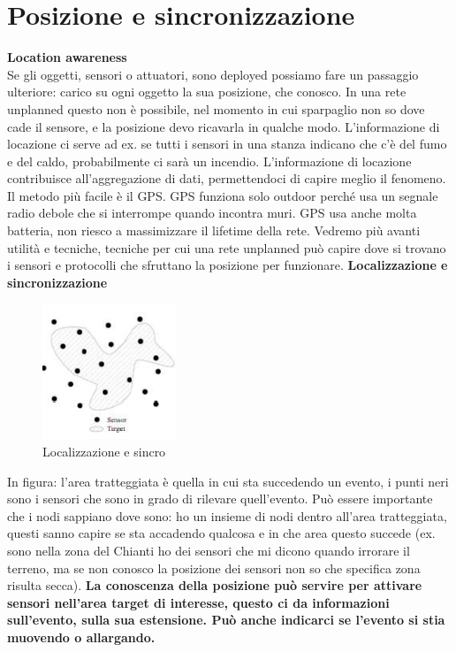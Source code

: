 \documentclass[12pt,italian]{report}
\begin{document}
\section{Posizione e sincronizzazione}
\label{sec:possinc}
\noindent\textbf{Location awareness} \\
Se gli oggetti, sensori o attuatori, sono deployed possiamo fare un passaggio ulteriore: carico su ogni oggetto la sua posizione, che conosco. In una rete unplanned questo non è possibile, nel momento in cui sparpaglio non so dove cade il sensore, e la posizione devo ricavarla in qualche modo. L'informazione di locazione ci serve ad ex. se tutti i sensori in una stanza indicano che c'è del fumo e del caldo, probabilmente ci sarà un incendio. L'informazione di locazione contribuisce all'aggregazione di dati, permettendoci di capire meglio il fenomeno. 
\bigbreak
Il metodo più facile è il GPS. GPS funziona solo outdoor perché usa un segnale radio debole che si interrompe quando incontra muri. GPS usa anche molta batteria, non riesco a massimizzare il lifetime della rete. 
\bigbreak
Vedremo più avanti utilità e tecniche, tecniche per cui una rete unplanned può capire dove si trovano i sensori e protocolli che sfruttano la posizione per funzionare.
\bigbreak
\noindent\textbf{Localizzazione e sincronizzazione} 
\begin{figure}[h]
	\centering
    \includegraphics[width=40mm]{img/locsinc.PNG}
    \caption{Localizzazione e sincro}
    \label{fig:locsin}
\end{figure}

\noindent In figura: l'area tratteggiata è quella in cui sta succedendo un evento, i punti neri sono i sensori che sono in grado di rilevare quell'evento. Può essere importante che i nodi sappiano dove sono: ho un insieme di nodi dentro all'area tratteggiata, questi sanno capire se sta accadendo qualcosa e in che area questo succede (ex. sono nella zona del Chianti ho dei sensori che mi dicono quando irrorare il terreno, ma se non conosco la posizione dei sensori non so che specifica zona risulta secca). 
\bigbreak
\textbf{La conoscenza della posizione può servire per attivare sensori nell'area target di interesse, questo ci da informazioni sull'evento, sulla sua estensione. Può anche indicarci se l'evento si stia muovendo o allargando.} \\
\end{document}
